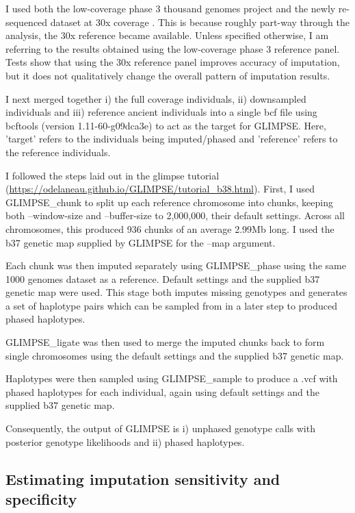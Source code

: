 I used both the low-coverage phase 3 thousand genomes project \cite{1000GenomesProjectConsortium2015} and the newly re-sequenced dataset at 30x coverage \cite{byrska2021high}. This is because roughly part-way through the analysis, the 30x reference became available. Unless specified otherwise, I am referring to the results obtained using the low-coverage phase 3 reference panel. Tests show that using the 30x reference panel improves accuracy of imputation, but it does not qualitatively change the overall pattern of imputation results. 

I next merged together i) the full coverage individuals, ii) downsampled individuals and iii) reference ancient individuals into a single bcf file using bcftools (version 1.11-60-g09dca3e) \cite{li2011statistical} to act as the target for GLIMPSE. Here, 'target' refers to the individuals being imputed/phased and 'reference' refers to the reference individuals.

I followed the steps laid out in the glimpse tutorial (\url{https://odelaneau.github.io/GLIMPSE/tutorial_b38.html}). First, I used GLIMPSE\_chunk to split up each reference chromosome into chunks, keeping both --window-size and --buffer-size to 2,000,000, their default settings. Across all chromosomes, this produced 936 chunks of an average 2.99Mb long. I used the b37 genetic map supplied by GLIMPSE for the --map argument. 

Each chunk was then imputed separately using GLIMPSE\_phase using the same 1000 genomes dataset as a reference. Default settings and the supplied b37 genetic map were used. This stage both imputes missing genotypes and generates a set of haplotype pairs which can be sampled from in a later step to produced phased haplotypes.

GLIMPSE\_ligate was then used to merge the imputed chunks back to form single chromosomes using the default settings and the supplied b37 genetic map. 

Haplotypes were then sampled using GLIMPSE\_sample to produce a .vcf with phased haplotypes for each individual, again using default settings and the supplied b37 genetic map. 

Consequently, the output of GLIMPSE is i) unphased genotype calls with posterior genotype likelihoods and ii) phased haplotypes. 

\subsection{Estimating imputation sensitivity and specificity}

